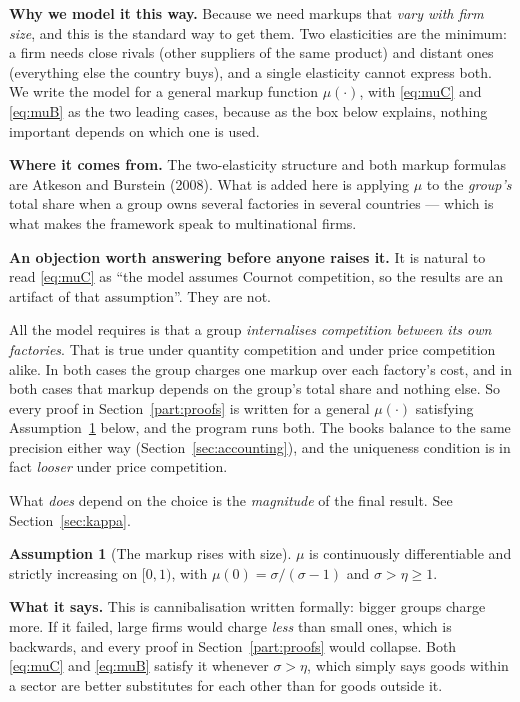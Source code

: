 \documentclass[11pt]{article}
\newenvironment{keypoint}
  {\begin{lrbox}{\kbox}\begin{minipage}{0.93\textwidth}\vspace{3pt}}
  {\vspace{3pt}\end{minipage}\end{lrbox}\begin{center}\fbox{\usebox{\kbox}}\end{center}}
\newcommand{\says}[1]{\smallskip\noindent\textbf{What it says.} #1\smallskip}
\newcommand{\why}[1]{\smallskip\noindent\textbf{Why we model it this way.} #1\smallskip}
\newcommand{\from}[1]{\smallskip\noindent\textbf{Where it comes from.} #1\smallskip}
\theoremstyle{plain}
\theoremstyle{remark}
\theoremstyle{definition}
\newtheorem{assumption}{Assumption}
\begin{document}
\why{Because we need markups that \emph{vary with firm size}, and this is the standard
way to get them. Two elasticities are the minimum: a firm needs close rivals (other
suppliers of the same product) and distant ones (everything else the country buys),
and a single elasticity cannot express both. We write the model for a general markup
function $\mu(\cdot)$, with \eqref{eq:muC} and \eqref{eq:muB} as the two leading
cases, because as the box below explains, nothing important depends on which one is
used.}

\from{The two-elasticity structure and both markup formulas are Atkeson and Burstein
(2008). What is added here is applying $\mu$ to the \emph{group's} total share when a
group owns several factories in several countries --- which is what makes the
framework speak to multinational firms.}

\begin{keypoint}
\textbf{An objection worth answering before anyone raises it.} It is natural to read
\eqref{eq:muC} as ``the model assumes Cournot competition, so the results are an
artifact of that assumption''. They are not.

All the model requires is that a group \emph{internalises competition between its own
factories}. That is true under quantity competition and under price competition alike.
In both cases the group charges one markup over each factory's cost, and in both cases
that markup depends on the group's total share and nothing else. So every proof in
Section~\ref{part:proofs} is written for a general $\mu(\cdot)$ satisfying
Assumption~\ref{as:mu} below, and the program runs both. The books balance to the same
precision either way (Section~\ref{sec:accounting}), and the uniqueness condition is
in fact \emph{looser} under price competition.

What \emph{does} depend on the choice is the \emph{magnitude} of the final result. See
Section~\ref{sec:kappa}.
\end{keypoint}

\begin{assumption}[The markup rises with size]\label{as:mu}
$\mu$ is continuously differentiable and strictly increasing on $[0,1)$, with
$\mu(0)=\sigma/(\sigma-1)$ and $\sigma>\eta\ge1$.
\end{assumption}

\says{This is cannibalisation written formally: bigger groups charge more. If it
failed, large firms would charge \emph{less} than small ones, which is backwards, and
every proof in Section~\ref{part:proofs} would collapse. Both \eqref{eq:muC} and \eqref{eq:muB} satisfy
it whenever $\sigma>\eta$, which simply says goods within a sector are better
substitutes for each other than for goods outside it.}
\end{document}
